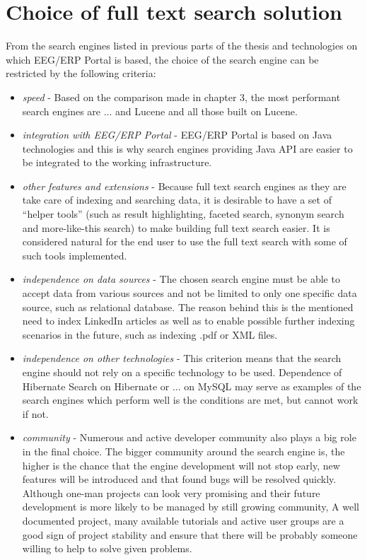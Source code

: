 \documentclass[12pt, oneside, a4paper]{book}
\begin{document}
\section{Choice of full text search solution}

From the search engines listed in previous parts of the thesis and technologies on which EEG/ERP Portal is based, the choice of the search engine can be restricted by the following criteria:

\begin{itemize}
	\item \textit{speed} - Based on the comparison made in chapter 3, the most performant search engines are ... and Lucene and all those built on Lucene.
	\item \textit{integration with EEG/ERP Portal} - EEG/ERP Portal is based on Java technologies and this is why search engines providing Java API are easier to be integrated to the working infrastructure.
	\item \textit{other features and extensions} - Because full text search
engines as they are take care of indexing and searching data, it is desirable to have a set of ``helper tools'' (such as result highlighting, faceted search, synonym search and more-like-this search) to make building full text search easier. It is considered natural for the end user to use the full text search with some of such tools implemented. 
	\item \textit{independence on data sources} - The chosen search engine must be able to accept data from various sources and not be limited to only one specific data source, such as relational database. The reason behind this is the mentioned need to index LinkedIn articles as well as to enable possible further indexing scenarios in the future, such as indexing .pdf or XML files.
	\item \textit{independence on other technologies} - This criterion means that the search engine should not rely on a specific technology to be used. Dependence of Hibernate Search on Hibernate or ... on MySQL may serve as examples of the search engines which perform well is the conditions are met, but cannot work if not. 
	\item \textit{community} - Numerous and active developer community also plays a big role in the final choice. The bigger community around the search engine is, the higher is the chance that the engine development will not stop early, new features will be introduced and that found bugs will be resolved quickly. Although one-man projects can look very promising and their future development is more likely to be managed by still growing community, 
A well documented project, many available tutorials and active user groups are a good sign of project stability and ensure that there will be probably someone willing to help to solve given problems.

\end{itemize}
\end{document}
